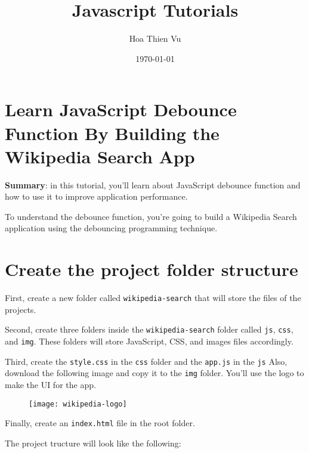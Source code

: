 \documentclass[11pt]{article}
\title{\textbf{\huge Javascript Tutorials}}
\author{Hoa Thien Vu}
\date{\today}
\newenvironment{displayquote} %
{\begin{shaded*}\noindent
\quoting[leftmargin=0pt, vskip=0pt]
}
 {\endquoting
 \end{shaded*}
}
\begin{document}
\maketitle
\newpage
\tableofcontents
\cleardoublepage
\newpage

\section*{\huge Learn JavaScript Debounce Function By Building the Wikipedia Search App}

\begin{displayquote}
\textbf{Summary}: in this tutorial, you'll learn about JavaScript debounce 
function and how to use it to improve application performance.
\end{displayquote}

\noindent
To understand the debounce function, you're going to build a Wikipedia
Search application using the debouncing programming technique.

\section*{Create the project folder structure}

First, create a new folder called \verb|wikipedia-search| that will store
the files of the projects.
\newline

\noindent
Second, create three folders inside the \verb|wikipedia-search| folder called
\verb|js|, \verb|css|, and \verb|img|. These folders will store JavaScript, CSS, and
images files accordingly.
\newline

\noindent
Third, create the \verb|style.css| in the \verb|css| folder and the \verb|app.js| in
the \verb|js| Also, download the following image and copy it to the \verb|img|
folder. You'll use the logo to make the UI for the app.
\newline

\begin{figure}[h]
\centering
\texttt{[image: wikipedia-logo]}
\end{figure}
\newpage

\noindent
Finally, create an \verb|index.html| file in the root folder.
\newline

\noindent
The project tructure will look like the following:
\newline
\end{document}
